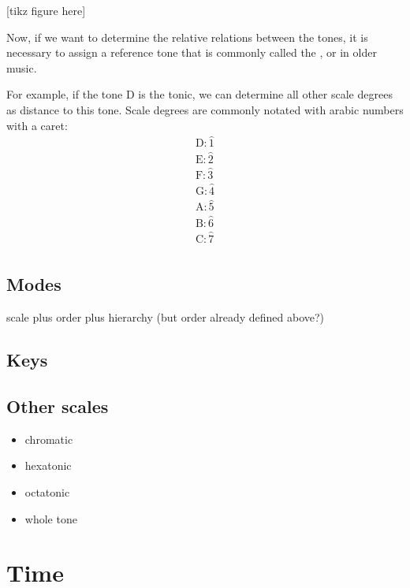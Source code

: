 \documentclass[letterpaper,10pt,english]{sphinxmanual}
\begin{document}
{[}tikz figure here{]}

Now, if we want to determine the relative relations between the tones,
it is necessary to assign a reference tone that is commonly called the ,
or  in older music.

For example, if the tone D is the tonic, we can determine all other scale degrees
as distance to this tone. Scale degrees are commonly notated with arabic numbers with a caret:
\begin{equation*}
\begin{split}\text{D}: \hat{1}\\
\text{E}: \hat{2}\\
\text{F}: \hat{3}\\
\text{G}: \hat{4}\\
\text{A}: \hat{5}\\
\text{B}: \hat{6}\\
\text{C}: \hat{7}\\\end{split}
\end{equation*}

\subsection{Modes}
\label{\detokenize{1_fundamentals:modes}}
scale plus order plus hierarchy (but order already defined above?)


\subsection{Keys}
\label{\detokenize{1_fundamentals:keys}}

\subsection{Other scales}
\label{\detokenize{1_fundamentals:other-scales}}\begin{itemize}
\item {} 
chromatic

\item {} 
hexatonic

\item {} 
octatonic

\item {} 
whole tone

\end{itemize}


\section{Time}
\label{\detokenize{1_fundamentals:time}}
\end{document}
